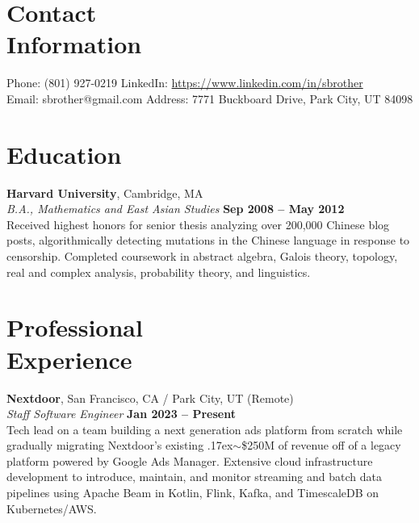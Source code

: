 \documentclass[margin,line]{resume}
\begin{document}
\begin{resume}
    \section{\mysidestyle Contact\\Information}

    Phone: (801) 927-0219       \hfill LinkedIn: \url{https://www.linkedin.com/in/sbrother} \\
    \noindent Email: sbrother@gmail.com  \hfill Address: 7771 Buckboard Drive, Park City, UT 84098 \vspace{0mm}\\\vspace{-4.5mm}

    \section{\mysidestyle Education}

    \textbf{Harvard University}, Cambridge, MA \vspace{2mm}\\\vspace{1mm}%
    \textsl{B.A., Mathematics and East Asian Studies} \hfill \textbf{Sep 2008 -- May 2012}\\
    Received highest honors for senior thesis analyzing over 200,000 Chinese
    blog posts, algorithmically detecting mutations in the Chinese language in
    response to censorship. Completed coursework in abstract algebra,
    Galois theory, topology, real and complex analysis, probability theory, and
    linguistics.

    \section{\mysidestyle Professional\\Experience}

    \textbf{Nextdoor}, San Francisco, CA / Park City, UT (Remote)  \vspace{2mm}\\\vspace{1mm}%
    \textsl{Staff Software Engineer} \hfill \textbf{Jan 2023 -- Present}\\
    Tech lead on a team building a next generation ads platform from scratch
    while gradually migrating Nextdoor's existing
    {\raise.17ex\hbox{$\scriptstyle\sim$}}\$250M of revenue off of a legacy
    platform powered by Google Ads Manager. Extensive cloud infrastructure
    development to introduce, maintain, and monitor streaming and batch data
    pipelines using Apache Beam in Kotlin, Flink, Kafka, and TimescaleDB on
    Kubernetes/AWS.


\end{resume}
\end{document}
